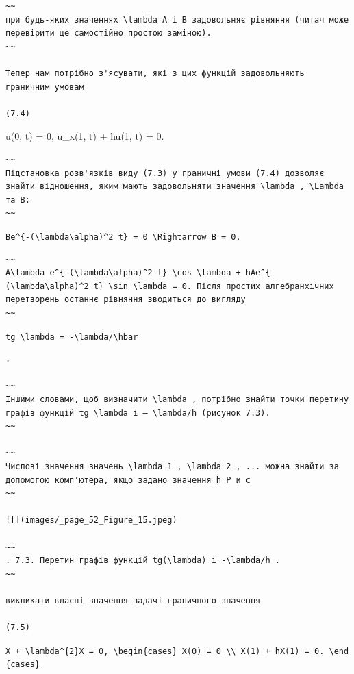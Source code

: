 \documentclass[
  ukrainian,
]{article}
\begin{document}
\begin{verbatim}
~~
при будь-яких значеннях \lambda A і B задовольняє рівняння (читач може перевірити це самостійно простою заміною).
~~

Тепер нам потрібно з'ясувати, які з цих функцій задовольняють граничним умовам

(7.4)
\end{verbatim}

u(0, t) = 0, u\_x(1, t) + hu(1, t) = 0.

\begin{verbatim}
~~
Підстановка розв'язків виду (7.3) у граничні умови (7.4) дозволяє знайти відношення, яким мають задовольняти значення \lambda , \Lambda та B:
~~
\end{verbatim}

\texttt{Be\^{}\{-(\textbackslash{}lambda\textbackslash{}alpha)\^{}2\ t\}\ =\ 0\ \textbackslash{}Rightarrow\ B\ =\ 0,}

\begin{verbatim}
~~
A\lambda e^{-(\lambda\alpha)^2 t} \cos \lambda + hAe^{-(\lambda\alpha)^2 t} \sin \lambda = 0. Після простих алгебранхічних перетворень останнє рівняння зводиться до вигляду
~~
\end{verbatim}

\texttt{tg\ \textbackslash{}lambda\ =\ -\textbackslash{}lambda/\textbackslash{}hbar}

\begin{verbatim}
.

~~
Іншими словами, щоб визначити \lambda , потрібно знайти точки перетину графів функцій tg \lambda і — \lambda/h (рисунок 7.3).
~~

~~
Числові значення значень \lambda_1 , \lambda_2 , ... можна знайти за допомогою комп'ютера, якщо задано значення h Р и с
~~

![](images/_page_52_Figure_15.jpeg)

~~
. 7.3. Перетин графів функцій tg(\lambda) і -\lambda/h .
~~

викликати власні значення задачі граничного значення

(7.5)
\end{verbatim}

\texttt{X\textquotesingle{}\textquotesingle{}\ +\ \textbackslash{}lambda\^{}\{2\}X\ =\ 0,\ \textbackslash{}begin\{cases\}\ X(0)\ =\ 0\ \textbackslash{}\textbackslash{}\ X\textquotesingle{}(1)\ +\ hX(1)\ =\ 0.\ \textbackslash{}end\{cases\}}
\end{document}
